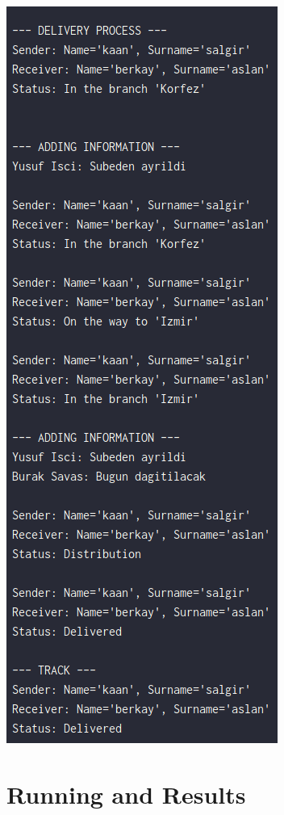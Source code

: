 \documentclass[a4paper]{article}
\begin{document}
\begin{Large}
\begin{center}
\includegraphics[height=0.45\textheight,keepaspectratio]{test-cases-out}
\end{center}

\newpage

\section{Running and Results}


\end{Large}
\end{document}
